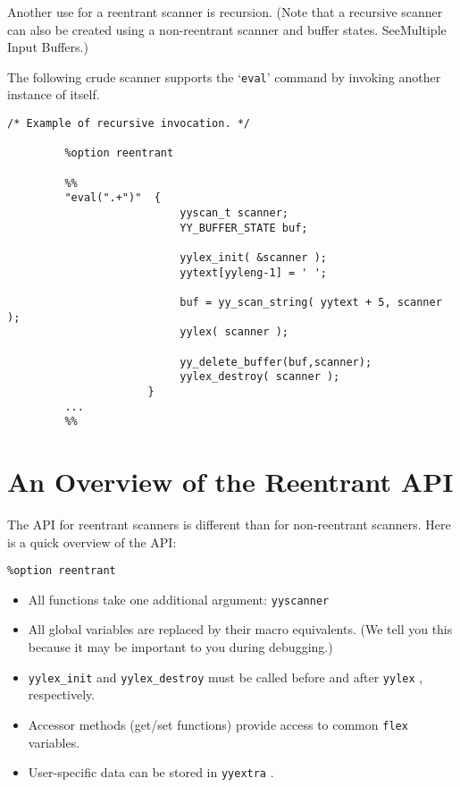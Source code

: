 \documentclass[openany,oneside]{book}
\begin{document}
Another use for a reentrant scanner is recursion. 
(Note that a recursive scanner can also be created using a non-reentrant scanner and
buffer states. SeeMultiple Input Buffers.)

The following crude scanner supports the ‘\verb`eval`’ command by invoking
another instance of itself.


\begin{verbatim}
/* Example of recursive invocation. */
     
         %option reentrant
     
         %%
         "eval(".+")"  {
                           yyscan_t scanner;
                           YY_BUFFER_STATE buf;
     
                           yylex_init( &scanner );
                           yytext[yyleng-1] = ' ';
     
                           buf = yy_scan_string( yytext + 5, scanner );
                           yylex( scanner );
     
                           yy_delete_buffer(buf,scanner);
                           yylex_destroy( scanner );
                      }
         ...
         %%
\end{verbatim}

\section{An Overview of the Reentrant API}


The API for reentrant scanners is different than for non-reentrant
scanners. Here is a quick overview of the API:

\verb`%option reentrant` 

\begin{itemize} 
\item All functions take one additional argument: \verb`yyscanner`
\item All global variables are replaced by their macro equivalents. 
(We tell you this because it may be important to you during debugging.)
\item  \verb`yylex_init` and \verb`yylex_destroy` must be called before and
after \verb`yylex` , respectively.
\item Accessor methods (get/set functions) provide access to common \verb`flex` variables.
\item User-specific data can be stored in \verb`yyextra` .
\end{itemize}
\end{document}
